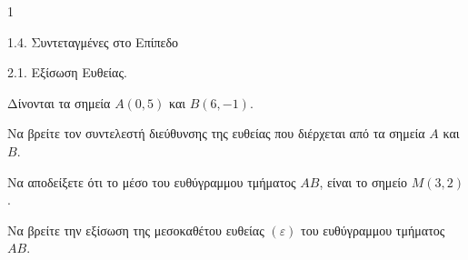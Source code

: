 \begin{ylh}{1}
    \item 1.4. Συντεταγμένες στο Επίπεδο
    \item 2.1. Εξίσωση Ευθείας.
\end{ylh}
Δίνονται τα σημεία $A(0,5)$ και $B(6,-1)$.
\begin{alist}
    \item
    \begin{rlist}
        \item Να βρείτε τον συντελεστή διεύθυνσης της ευθείας που διέρχεται από τα σημεία $A$ και $B$. 
        \item Να αποδείξετε ότι το μέσο του ευθύγραμμου τμήματος $AB$, είναι το σημείο $M(3,2)$. 
    \end{rlist}
    \item Να βρείτε την εξίσωση της μεσοκαθέτου ευθείας $(\varepsilon)$ του ευθύγραμμου τμήματος $AB$. 
\end{alist}
